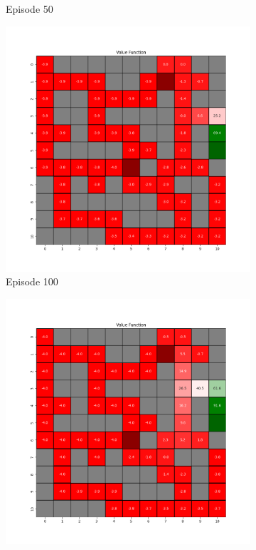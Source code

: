 \documentclass{assignment}
\begin{document}
\begin{figure}[H]
\begin{subfigure}{0.3\textwidth}
    \caption{Episode 50}
    \end{subfigure}\hfill
    \begin{subfigure}{0.3\textwidth}
        \includegraphics[width=\textwidth]{figures/value_q/gamma_sweep/value_function_alpha_0.1_gamma_0.75_epsilon_0.2_iteration_100.png}
    \caption{Episode 100}
    \end{subfigure}
    \begin{subfigure}{0.3\textwidth}
        \includegraphics[width=\textwidth]{figures/value_q/gamma_sweep/value_function_alpha_0.1_gamma_0.75_epsilon_0.2_iteration_1000.png}

\end{subfigure}
\end{figure}
\end{document}
